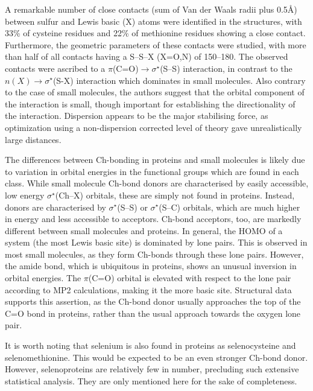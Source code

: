 \begin{refsection}
A remarkable number of close contacts (sum of Van der Waals radii plus 0.5\AA) between sulfur and Lewis basic (X) atoms were identified in the structures, with 33\% of cysteine residues and 22\% of methionine residues showing a close contact.
Furthermore, the geometric parameters of these contacts were studied, with more than half of all contacts having a S--S--X (X=O,N) of 150--180\degree.
The observed contacts were ascribed to a $\pi$(C=O)$\rightarrow \sigma^{\star}$(S--S) interaction, in contrast to the $n(X) \rightarrow \sigma^{\star}$(S-X) interaction which dominates in small molecules.
Also contrary to the case of small molecules, the authors suggest that the orbital component of the interaction is small, though important for establishing the directionality of the interaction.
Dispersion appears to be the major stabilising force, as optimization using a non-dispersion corrected level of theory gave unrealistically large distances.

The differences between Ch-bonding in proteins and small molecules is likely due to variation in orbital energies in the functional groups which are found in each class.
While small molecule Ch-bond donors are characterised by easily accessible, low energy $\sigma^{\star}$(Ch--X) orbitals, these are simply not found in proteins.
Instead, donors are characterised by $\sigma^{\star}$(S--S) or $\sigma^{\star}$(S--C) orbitals, which are much higher in energy and less accessible to acceptors.
Ch-bond acceptors, too, are markedly different between small molecules and proteins.
In general, the HOMO of a system (the most Lewis basic site) is dominated by lone pairs.
This is observed in most small molecules, as they form Ch-bonds through these lone pairs.
However, the amide bond, which is ubiquitous in proteins, shows an unusual inversion in orbital energies.
The $\pi$(C=O) orbital is elevated with respect to the lone pair according to MP2 calculations, making it the more basic site.
Structural data supports this assertion, as the Ch-bond donor usually approaches the top of the C=O bond in proteins, rather than the usual approach towards the oxygen lone pair.\autocite{Iwaoka2012}

It is worth noting that selenium is also found in proteins as selenocysteine and selenomethionine.
This would be expected to be an even stronger Ch-bond donor.
However, selenoproteins are relatively few in number, precluding such extensive statistical analysis.\autocite{Iwaoka2015}
They are only mentioned here for the sake of completeness.


\end{refsection}
